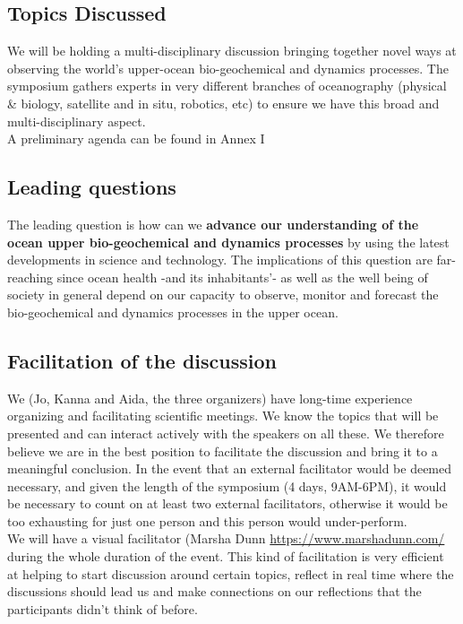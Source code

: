 \subsection{Topics Discussed}

We will be holding a multi-disciplinary discussion bringing together novel ways at observing the world’s upper-ocean bio-geochemical and dynamics processes. The symposium gathers experts in very different branches of oceanography (physical & biology, satellite and in situ, robotics, etc) to ensure we have this broad and multi-disciplinary aspect. \\


A preliminary agenda can be found in Annex I


\subsection{Leading questions}

The leading question is how can we \textbf{advance our understanding of the ocean upper bio-geochemical and dynamics processes} by using the latest developments in science and technology. The implications of this question are far-reaching since ocean health -and its inhabitants'- as well as the well being of society in general depend on our capacity to observe, monitor and forecast the bio-geochemical and dynamics processes in the upper ocean.\\


\subsection{Facilitation of the discussion}

We (Jo, Kanna and Aida, the three organizers) have long-time experience organizing and facilitating scientific meetings. We know the topics that will be presented and can interact actively with the speakers on all these. We therefore believe we are in the best position to facilitate the discussion and bring it to a meaningful conclusion. In the event that an external facilitator would be deemed necessary, and given the length of the symposium (4 days, 9AM-6PM), it would be necessary to count on at least two external facilitators, otherwise it would be too exhausting for just one person and this person would under-perform.\\

We will have a visual facilitator (Marsha Dunn \url{https://www.marshadunn.com/} during the whole duration of the event. This kind of facilitation is very efficient at helping to start discussion around certain topics, reflect in real time where the discussions should lead us and make connections on our reflections that the participants didn't think of before. \\


